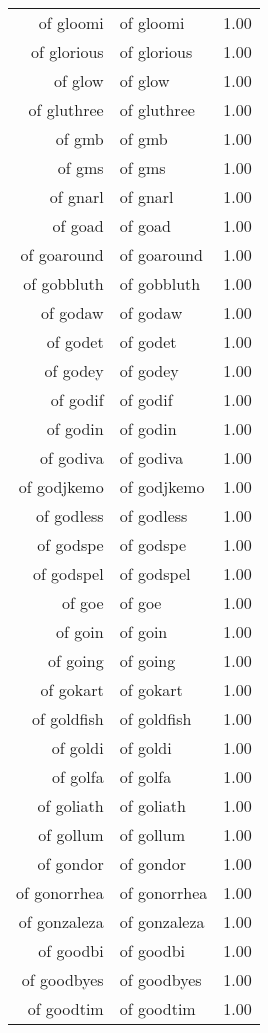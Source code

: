 \begin{table}[ht]
\begin{tabular}{rlr}
  of gloomi & of gloomi & 1.00 \\ 
  of glorious & of glorious & 1.00 \\ 
  of glow & of glow & 1.00 \\ 
  of gluthree & of gluthree & 1.00 \\ 
  of gmb & of gmb & 1.00 \\ 
  of gms & of gms & 1.00 \\ 
  of gnarl & of gnarl & 1.00 \\ 
  of goad & of goad & 1.00 \\ 
  of goaround & of goaround & 1.00 \\ 
  of gobbluth & of gobbluth & 1.00 \\ 
  of godaw & of godaw & 1.00 \\ 
  of godet & of godet & 1.00 \\ 
  of godey & of godey & 1.00 \\ 
  of godif & of godif & 1.00 \\ 
  of godin & of godin & 1.00 \\ 
  of godiva & of godiva & 1.00 \\ 
  of godjkemo & of godjkemo & 1.00 \\ 
  of godless & of godless & 1.00 \\ 
  of godspe & of godspe & 1.00 \\ 
  of godspel & of godspel & 1.00 \\ 
  of goe & of goe & 1.00 \\ 
  of goin & of goin & 1.00 \\ 
  of going & of going & 1.00 \\ 
  of gokart & of gokart & 1.00 \\ 
  of goldfish & of goldfish & 1.00 \\ 
  of goldi & of goldi & 1.00 \\ 
  of golfa & of golfa & 1.00 \\ 
  of goliath & of goliath & 1.00 \\ 
  of gollum & of gollum & 1.00 \\ 
  of gondor & of gondor & 1.00 \\ 
  of gonorrhea & of gonorrhea & 1.00 \\ 
  of gonzaleza & of gonzaleza & 1.00 \\ 
  of goodbi & of goodbi & 1.00 \\ 
  of goodbyes & of goodbyes & 1.00 \\ 
  of goodtim & of goodtim & 1.00 \\ 

\end{tabular}
\end{table}
